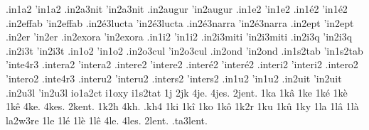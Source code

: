 {                    .in1a2
                    'in1a2
                    .in2a3nit
                    'in2a3nit
                    .in2augur
                    'in2augur
                    .in1e2
                    'in1e2
                    .in1é2
                    'in1é2
                    .in2effab %
                    'in2effab
                    .in2é3lucta
                    'in2é3lucta
                    .in2é3narra
                    'in2é3narra
                    .in2ept
                    'in2ept
                    .in2er
                    'in2er
                    .in2exora %
                    'in2exora
                    .in1i2
                    'in1i2
                    .in2i3miti
                    'in2i3miti
                    .in2i3q
                    'in2i3q
                    .in2i3t
                    'in2i3t
                    .in1o2
                    'in1o2
                    .in2o3cul
                    'in2o3cul
                    .in2ond
                    'in2ond
                    .in1s2tab
                    'in1s2tab
                    'inte4r3
                    .intera2
                    'intera2
                    .intere2
                    'intere2
                    .interé2
                    'interé2
                    .interi2
                    'interi2
                    .intero2
                    'intero2
                    .inte4r3
                    .interu2
                    'interu2
                    .inters2
                    'inters2
                    .in1u2
                    'in1u2
                    .in2uit
                    'in2uit
                    .in2u3l
                    'in2u3l
                    io1a2ct
                    i1oxy
                    i1s2tat
1j
2jk
4je.
4jes.
2jent. %
1ka
1kâ
1ke
1ké
1kè
1kê
4ke.
4kes.
2kent. %
1k2h
4kh.
.kh4
1ki
1kî
1ko
1kô
1k2r
1ku
1kû
1ky
1la
1lâ
1là
                    la2w3re
1le
1lé
1lè
1lê
4le.
4les.
      2lent.
   .ta3lent.
}
